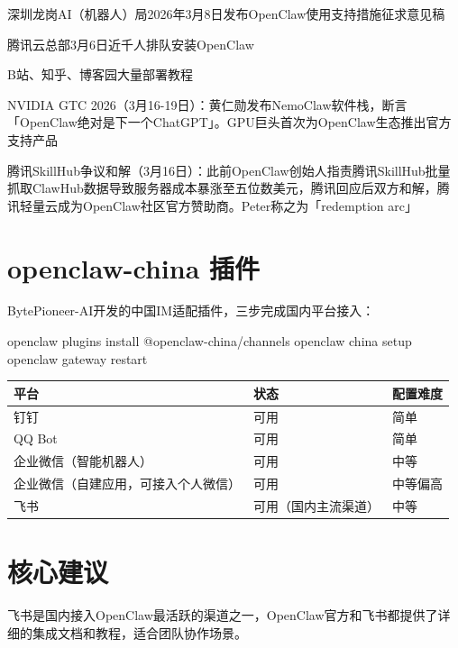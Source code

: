 \documentclass[
  10
]{article}
\newenvironment{Shaded}{}{}
\newcommand{\NormalTok}[1]{#1}
\newcounter{none} %
\begin{document}
深圳龙岗AI（机器人）局2026年3月8日发布OpenClaw使用支持措施征求意见稿

腾讯云总部3月6日近千人排队安装OpenClaw

B站、知乎、博客园大量部署教程

NVIDIA GTC
2026（3月16-19日）：黄仁勋发布NemoClaw软件栈，断言「OpenClaw绝对是下一个ChatGPT」。GPU巨头首次为OpenClaw生态推出官方支持产品

腾讯SkillHub争议和解（3月16日）：此前OpenClaw创始人指责腾讯SkillHub批量抓取ClawHub数据导致服务器成本暴涨至五位数美元，腾讯回应后双方和解，腾讯轻量云成为OpenClaw社区官方赞助商。Peter称之为「redemption
arc」

\section{openclaw-china 插件}\label{openclaw-china-ux63d2ux4ef6}

BytePioneer-AI开发的中国IM适配插件，三步完成国内平台接入：

\begin{Shaded}
\begin{Highlighting}[]
\NormalTok{openclaw plugins install @openclaw{-}china/channels  }
\NormalTok{openclaw china setup  }
\NormalTok{openclaw gateway restart}
\end{Highlighting}
\end{Shaded}

{\def\LTcaptype{none} %
\begin{longtable}[]{@{}|l|l|l|@{}}
\toprule\noalign{}
\endhead
\bottomrule\noalign{}
\endlastfoot
\hline
平台 & 状态 & 配置难度 \\
\hline
钉钉 & 可用 & 简单 \\
\hline
QQ Bot & 可用 & 简单 \\
\hline
企业微信（智能机器人） & 可用 & 中等 \\
\hline
企业微信（自建应用，可接入个人微信） & 可用 & 中等偏高 \\
\hline
飞书 & 可用（国内主流渠道） & 中等 \\
\hline
\end{longtable}
}

\section{核心建议}\label{ux6838ux5fc3ux5efaux8bae-25}

飞书是国内接入OpenClaw最活跃的渠道之一，OpenClaw官方和飞书都提供了详细的集成文档和教程，适合团队协作场景。
\end{document}
